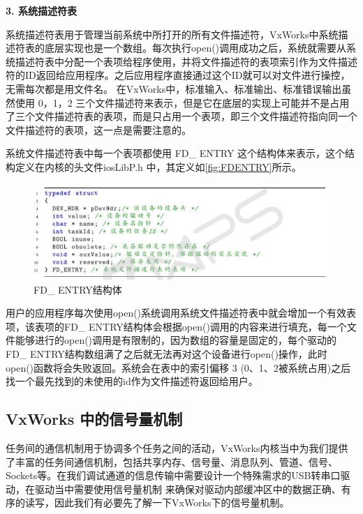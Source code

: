 \noindent \textbf{3. 系统描述符表}

	系统描述符表用于管理当前系统中所打开的所有文件描述符，VxWorks中系统描述符表的底层实现也是一个数组。每次执行open()调用成功之后，系统就需要从系统描述符表中分配一个表项给程序使用，并将文件描述符的表项索引作为文件描述符的ID返回给应用程序。之后应用程序直接通过这个ID就可以对文件进行操控，无需每次都是用文件名。
	在VxWorks中，标准输入、标准输出、标准错误输出虽然使用 0，1，2 三个文件描述符来表示，但是它在底层的实现上可能并不是占用了三个文件描述符表的表项，而是只占用一个表项，即三个文件描述符指向同一个文件描述符的表项\cite{VxWorks内核解读}\cite{An2003Implementation}，这一点是需要注意的。
		
	
系统文件描述符表中每一个表项都使用 FD\_ ENTRY 这个结构体来表示，这个结构定义在内核的头文件iosLibP.h 中，其定义如\autoref{fig:FDENTRY}所示。


\begin{figure}[!h]
\centering
\includegraphics[width=1.0\textwidth]{./graphics/FDENTRY.pdf}
\caption{FD\_ ENTRY结构体}\label{fig:FDENTRY}
\end{figure}

用户的应用程序每次使用open()系统调用系统文件描述符表中就会增加一个有效表项，该表项的FD\_ ENTRY结构体会根据open()调用的内容来进行填充，每一个文件能够进行的open()调用是有限制的，因为数组的容量是固定的，每个驱动的FD\_ ENTRY结构数组满了之后就无法再对这个设备进行open()操作，此时 open()函数将会失败返回\cite{VxWorks内核解读}。系统会在表中的索引偏移 3 (0、1、2被系统占用)之后找一个最先找到的未使用的id作为文件描述符返回给用户。




	
\subsection{VxWorks 中的信号量机制}
	
	任务间的通信机制用于协调多个任务之间的活动，VxWorks内核当中为我们提供了丰富的任务间通信机制，包括共享内存、信号量、消息队列、管道、信号、Sockets等\cite{胡明民2012基于实时操作系统}\cite{冯云贺2014基于}。在我们调试通道的信息传输中需要设计一个特殊需求的USB转串口驱动，在驱动当中需要使用信号量机制
	来确保对驱动内部缓冲区中的数据正确、有序的读写，因此我们有必要先了解一下VxWorks下的信号量机制。

